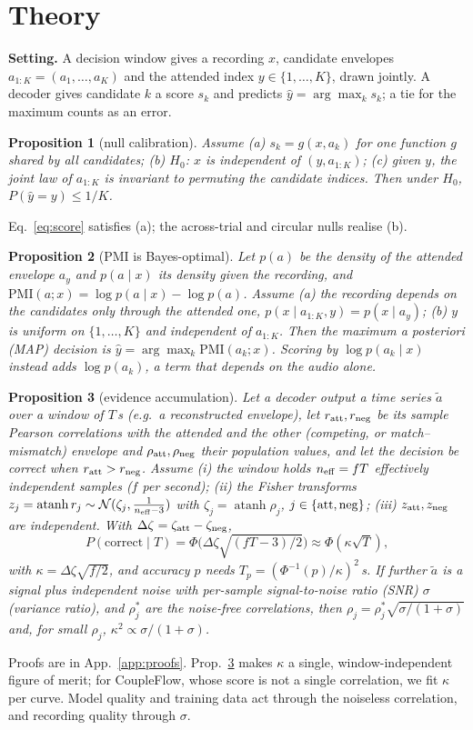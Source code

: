 \documentclass[10pt,twocolumn,letterpaper]{article}
\newtheorem{proposition}{Proposition}
\newcommand{\PMI}{\mathrm{PMI}}
\begin{document}
\section{Theory}\label{sec:theory}
\textbf{Setting.} A decision window gives a recording $x$, candidate envelopes
$a_{1:K}=(a_1,\dots,a_K)$ and the attended index $y\in\{1,\dots,K\}$, drawn jointly. A
decoder gives candidate $k$ a score $s_k$ and predicts $\hat y=\arg\max_k s_k$; a tie for the
maximum counts as an error.
\begin{proposition}[null calibration]\label{prop:null}
Assume (a) $s_k=g(x,a_k)$ for one function $g$ shared by all candidates; (b) $H_0$: $x$ is
independent of $(y,a_{1:K})$; (c) given $y$, the joint law of $a_{1:K}$ is invariant to
permuting the candidate indices. Then under $H_0$, $P(\hat y=y)\le 1/K$.
\end{proposition}
Eq.~\ref{eq:score} satisfies (a); the across-trial and circular nulls realise (b).
\begin{proposition}[PMI is Bayes-optimal]\label{prop:pmi}
Let $p(a)$ be the density of the attended envelope $a_y$ and $p(a\mid x)$ its density given
the recording, and $\PMI(a;x)=\log p(a\mid x)-\log p(a)$. Assume (a) the recording depends on
the candidates only through the attended one, $p(x\mid a_{1:K},y)=p(x\mid a_y)$; (b) $y$ is
uniform on $\{1,\dots,K\}$ and independent of $a_{1:K}$. Then the maximum a posteriori
(MAP) decision is $\hat y=\arg\max_k\PMI(a_k;x)$. Scoring by $\log p(a_k\mid x)$ instead adds
$\log p(a_k)$, a term that depends on the audio alone.
\end{proposition}
\begin{proposition}[evidence accumulation]\label{prop:law}
Let a decoder output a time series $\tilde a$ over a window of $T$\,s (e.g.\ a reconstructed
envelope), let $r_{\rm att},r_{\rm neg}$ be its sample Pearson correlations with the attended and
the other (competing, or match--mismatch) envelope and $\rho_{\rm att},\rho_{\rm neg}$ their
population values, and let the decision be correct when $r_{\rm att}>r_{\rm neg}$. Assume (i)
the window holds $n_{\rm eff}=fT$ effectively independent samples ($f$ per second); (ii) the
Fisher transforms $z_j=\operatorname{atanh}r_j\sim\mathcal N(\zeta_j,\frac{1}{n_{\rm eff}-3})$ with
$\zeta_j=\operatorname{atanh}\rho_j$, $j\in\{{\rm att},{\rm neg}\}$; (iii) $z_{\rm att},z_{\rm neg}$
are independent. With $\Delta\zeta=\zeta_{\rm att}-\zeta_{\rm neg}$,
\[P(\mathrm{correct}\mid T)=\Phi\big(\Delta\zeta\sqrt{(fT-3)/2}\big)\approx\Phi(\kappa\sqrt T),\]
with $\kappa=\Delta\zeta\sqrt{f/2}$, and accuracy $p$ needs $T_p=(\Phi^{-1}(p)/\kappa)^2$\,s. If further $\tilde a$ is a signal plus
independent noise with per-sample signal-to-noise ratio (SNR) $\sigma$ (variance ratio), and $\rho^\ast_j$
are the noise-free correlations, then $\rho_j=\rho^\ast_j\sqrt{\sigma/(1+\sigma)}$ and, for
small $\rho_j$, $\kappa^2\propto\sigma/(1+\sigma)$.
\end{proposition}
Proofs are in App.~\ref{app:proofs}. Prop.~\ref{prop:law} makes $\kappa$ a single,
window-independent figure of merit; for CoupleFlow, whose score is not a single
correlation, we fit $\kappa$ per curve. Model quality and training data act through the
noiseless correlation, and recording quality through $\sigma$.
\end{document}
